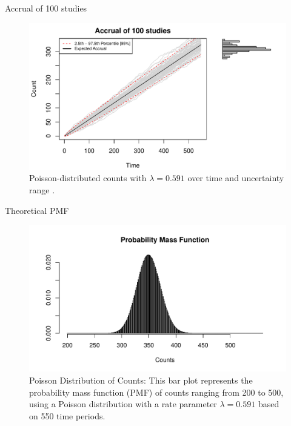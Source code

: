 \documentclass[english]{beamer}\usepackage[]{graphicx}\usepackage[]{xcolor}
\makeatletter
\def\maxwidth{ %
  \ifdim\Gin@nat@width>\linewidth
    \linewidth
  \else
    \Gin@nat@width
  \fi
}
\newenvironment{knitrout}{}{} %
\makeatother
\begin{document}
\begin{frame}{Accrual of 100 studies}

\begin{figure}
\begin{knitrout}
\color{fgcolor}
\includegraphics[width=\maxwidth]{figures/figunnamed-chunk-4-1} 
\end{knitrout}
  \caption{Poisson-distributed counts with $\lambda = 0.591$ over time and uncertainty range \citep{spiegelhalter2011visualizing, pkgacc}.}
\end{figure}

\end{frame}


\begin{frame}{Theoretical PMF}
\begin{figure}
\begin{knitrout}
\color{fgcolor}
\includegraphics[width=\maxwidth]{figures/figunnamed-chunk-5-1} 
\end{knitrout}
  \caption{Poisson Distribution of Counts: This bar plot represents the probability mass function (PMF) of counts ranging from 200 to 500, using a Poisson distribution with a rate parameter $\lambda = 0.591$ based on 550 time periods.}
  \label{fig:2_3}
\end{figure}
\end{frame}
\end{document}
